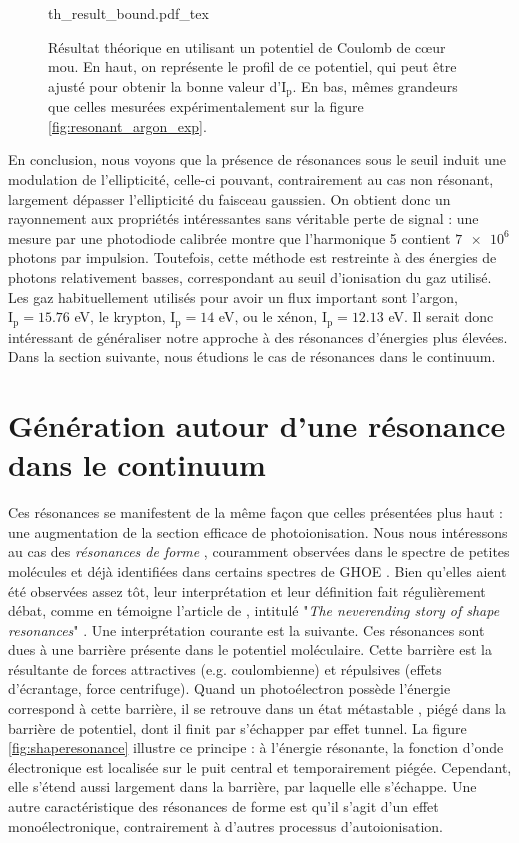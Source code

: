 \begin{figure}[!ht]
\centering
\def\svgwidth{1\columnwidth}
{th_result_bound.pdf_tex}
\caption{Résultat théorique en utilisant un potentiel de Coulomb de cœur mou. En haut, on représente le profil de ce potentiel, qui peut être ajusté pour obtenir la bonne valeur d'$\text{I}_{\text{p}}$. En bas, mêmes grandeurs que celles mesurées expérimentalement sur la figure \ref{fig:resonant_argon_exp}.}
\label{fig:resonant_argon_th_bound}
\end{figure}
\newpage
En conclusion, nous voyons que la présence de résonances sous le seuil induit une modulation de l'ellipticité, celle-ci pouvant, contrairement au cas non résonant, largement dépasser l'ellipticité du faisceau gaussien. On obtient donc un rayonnement aux propriétés intéressantes sans véritable perte de signal : une mesure par une photodiode calibrée montre que l'harmonique 5 contient $\num{7e6}$ photons par impulsion. Toutefois, cette méthode est restreinte à des énergies de photons relativement basses, correspondant au seuil d'ionisation du gaz utilisé. Les gaz habituellement utilisés pour avoir un flux important sont l'argon, $\text{I}_{\text{p}}=15.76$ eV, le krypton, $\text{I}_{\text{p}}=14$ eV, ou le xénon, $\text{I}_{\text{p}}=12.13$ eV. Il serait donc intéressant de généraliser notre approche à des résonances d'énergies plus élevées. Dans la section suivante, nous étudions le cas de résonances dans le continuum.

\section{Génération autour d'une résonance dans le continuum}
Ces résonances se manifestent de la même façon que celles présentées plus haut : une augmentation de la section efficace de photoionisation. Nous nous intéressons au cas des \textit{résonances de forme} , couramment observées dans le spectre de petites molécules et déjà identifiées dans certains spectres de GHOE . Bien qu'elles aient été observées assez tôt, leur interprétation et leur définition fait régulièrement débat, comme en témoigne l'article de , intitulé "\textit{The neverending story of shape resonances}" . Une interprétation courante est la suivante. Ces résonances sont dues à une barrière présente dans le potentiel moléculaire. Cette barrière est la résultante de forces attractives (e.g. coulombienne) et répulsives (effets d'écrantage, force centrifuge). Quand un photoélectron possède l'énergie correspond à cette barrière, il se retrouve dans un état métastable , piégé dans la barrière de potentiel, dont il finit par s'échapper par effet tunnel. La figure \ref{fig:shaperesonance} illustre ce principe : à l'énergie résonante, la fonction d'onde électronique est localisée sur le puit central et temporairement piégée. Cependant, elle s'étend aussi largement dans la barrière, par laquelle elle s'échappe. Une autre caractéristique des résonances de forme est qu'il s'agit d'un effet monoélectronique, contrairement à d'autres processus d'autoionisation.

